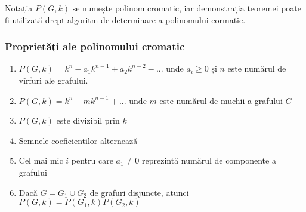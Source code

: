 \begin{frame}
Notația $P(G, k)$ se numește polinom cromatic, iar demonstrația teoremei 
poate fi utilizată drept algoritm de determinare a polinomului cormatic.
 
\end{frame}

\begin{frame}
  \frametitle{Proprietăți ale polinomului cromatic}
  

\begin{enumerate}
 \item $P(G,k) = k^n-a_1k^{n-1}+a_2k^{n-2}-...$ unde $a_i\geq 0$ și $n$ este 
 numărul de vîrfuri ale grafului.
\pause
 
 \item $P(G,k) = k^n-mk^{n-1}+...$ unde $m$ este numărul de muchii a grafului $G$
\pause
 \item $P(G,k)$ este divizibil prin $k$
\pause
 \item Semnele coeficienților alternează
\pause
 \item Cel mai mic $i$ pentru care $a_1\neq 0$ reprezintă numărul de componente a grafului
\pause
 \item Dacă $G=G_1\cup G_2$ de grafuri disjuncte, atunci $P(G,k) = P(G_1,k)P(G_2,k)$

\end{enumerate}
 
\end{frame}






